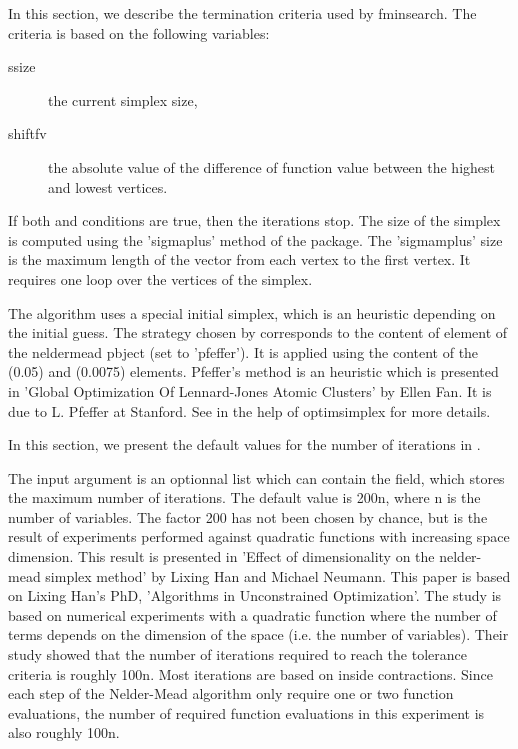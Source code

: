 %
\begin{Details}\relax
{}

In this section, we describe the termination criteria used by fminsearch.
The criteria is based on the following variables: \begin{description}

\item[ssize] the current simplex size,
\item[shiftfv] the absolute value of the difference of function value
between the highest and lowest vertices.

\end{description}


If both  and 
conditions are true, then the iterations stop. The size of the simplex is
computed using the 'sigmaplus' method of the  package. The
'sigmamplus' size is the maximum length of the vector from each vertex to the
first vertex. It requires one loop over the vertices of the simplex.


The  algorithm uses a special initial simplex, which is an
heuristic depending on the initial guess. The strategy chosen by
 corresponds to the content of 
element of the neldermead pbject (set to 'pfeffer').  It is applied using 
the content of the  (0.05) and
 (0.0075) elements. Pfeffer's method is an heuristic
which is presented in 'Global Optimization Of Lennard-Jones Atomic Clusters'
by Ellen Fan. It is due to L. Pfeffer at Stanford. See in the help of
optimsimplex for more details.


In this section, we present the default values for the number of iterations in
.

The  input argument is an optionnal list which can
contain the  field, which stores the maximum number of
iterations. The default value is 200n, where n is the number of variables.
The factor 200 has not been chosen by chance, but is the result of experiments
performed against quadratic functions with increasing space dimension.
This result is presented in 'Effect of dimensionality on the nelder-mead
simplex method' by Lixing Han and Michael Neumann. This paper is based on
Lixing Han's  PhD, 'Algorithms in Unconstrained Optimization'. The study is
based on numerical experiments with a quadratic function where the number of
terms depends on the dimension of the space (i.e. the number of variables).
Their study showed that the number of iterations required to reach the
tolerance criteria is roughly 100n. Most iterations are based on inside
contractions. Since each step of the Nelder-Mead algorithm only require one
or two function evaluations, the number of required function evaluations in
this experiment is also roughly 100n.


\end{Details}
